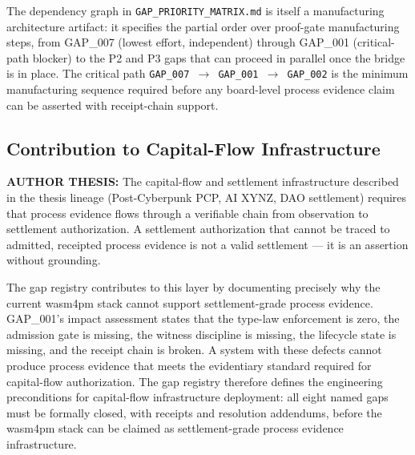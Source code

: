 The dependency graph in \texttt{GAP\_PRIORITY\_MATRIX.md} is itself a manufacturing
architecture artifact: it specifies the partial order over proof-gate manufacturing
steps, from GAP\_007 (lowest effort, independent) through GAP\_001 (critical-path
blocker) to the P2 and P3 gaps that can proceed in parallel once the bridge is in place.
The critical path \texttt{GAP\_007 $\rightarrow$ GAP\_001 $\rightarrow$ GAP\_002}
is the minimum manufacturing sequence required before any board-level process evidence
claim can be asserted with receipt-chain support.

\subsection{Contribution to Capital-Flow Infrastructure}
\label{sec:gaps-contribution-capital-flow}

\textbf{AUTHOR THESIS:} The capital-flow and settlement infrastructure described in the
thesis lineage (Post-Cyberpunk PCP, AI XYNZ, DAO settlement) requires that process
evidence flows through a verifiable chain from observation to settlement authorization.
A settlement authorization that cannot be traced to admitted, receipted process evidence
is not a valid settlement — it is an assertion without grounding.

The gap registry contributes to this layer by documenting precisely why the current
wasm4pm stack cannot support settlement-grade process evidence. GAP\_001's impact
assessment states that the type-law enforcement is zero, the admission gate is missing,
the witness discipline is missing, the lifecycle state is missing, and the receipt chain
is broken. A system with these defects cannot produce process evidence that meets the
evidentiary standard required for capital-flow authorization. The gap registry therefore
defines the engineering preconditions for capital-flow infrastructure deployment: all
eight named gaps must be formally closed, with receipts and resolution addendums, before
the wasm4pm stack can be claimed as settlement-grade process evidence infrastructure.
